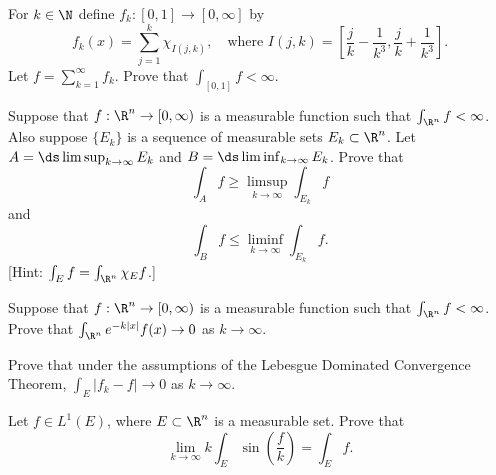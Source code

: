 \begin{hw} \label{hw:28}
For $k \in \N$ define $f_k: [0, 1]\to [0, \infty]$ by 
        \[
        f_k(x)= \sum_{j=1}^k \chi_{I(j, k)}, \quad \text{where } I(j, k)= \left[ \frac{j}{k} - \frac{1}{k^3}, \frac{j}{k}+\frac{1}{k^3} \right].
        \]
Let $f= \sum_{k=1}^\infty f_k$. Prove that $\int_{[0, 1]} f <\infty$. \\
\end{hw}


\begin{hw} \label{hw:29}
Suppose that $f: \R^n \to [0, \infty)$ is a measurable function such that $\int_{\R^n} f < \infty$. Also suppose $\{ E_k \}$ is a sequence of measurable sets $E_k \subset \R^n$. Let $A= \ds\limsup_{k \to \infty} E_k$ and $B= \ds\liminf_{k \to \infty} E_k$. Prove that 
	\[
	\int_A f \geq \limsup_{k \to \infty} \int_{E_k} f
	\]
and 
	\[
	\int_B f \leq \liminf_{k \to \infty} \int_{E_k} f.
	\]
[Hint: $\int_E f= \int_{\R^n} \chi_E f$.] \\
\end{hw}


\begin{hw} \label{hw:30}
Suppose that $f: \R^n \to [0, \infty)$ is a measurable function such that $\int_{\R^n} f < \infty$. Prove that $\int_{\R^n} e^{-k|x|} f(x) \to 0$ as $k \to \infty$. \\
\end{hw}






\begin{hw} \label{hw:31}
Prove that under the assumptions of the Lebesgue Dominated Convergence Theorem, $\int_E |f_k-f| \to 0$ as $k \to \infty$. \\
\end{hw}


\begin{hw} \label{hw:32}
Let $f \in L^1(E)$, where $E \subset \R^n$ is a measurable set. Prove that
        \[
        \lim_{k \to \infty} k \int_E \sin \left( \frac{f }{k} \right)= \int_E f.
         \]
\end{hw}


